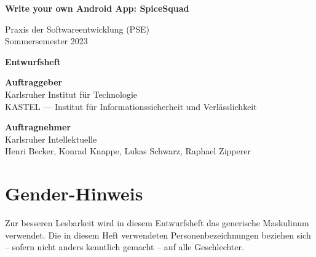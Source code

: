 \documentclass[parskip=full]{scrartcl}
\begin{document}


\begin{titlepage}
    \begin{center}
        \begin{Huge}
            {\textbf{Write your own Android App: SpiceSquad}}
        \end{Huge}
        \vspace{12px}

        Praxis der Softwareentwicklung (PSE)\\
        Sommersemester 2023\\
        \vspace{150px}

        \begin{Huge}
            {\textbf{Entwurfsheft}}
        \end{Huge}
        \vspace{12px}

        \textbf{Auftraggeber}\\
        Karlsruher Institut für Technologie\\
        KASTEL — Institut für Informationssicherheit und Verlässlichkeit\\
        \vspace{330px}

        \textbf{Auftragnehmer}\\
        Karlsruher Intellektuelle\\
        Henri Becker, Konrad Knappe, Lukas Schwarz, Raphael Zipperer\\
    \end{center}
\end{titlepage}

\tableofcontents
\newpage

\section*{Gender-Hinweis}
Zur besseren Lesbarkeit wird in diesem Entwurfsheft das generische Maskulinum verwendet.
Die in diesem Heft verwendeten Personenbezeichnungen beziehen sich – sofern nicht anders kenntlich gemacht – auf alle Geschlechter.
\end{document}
